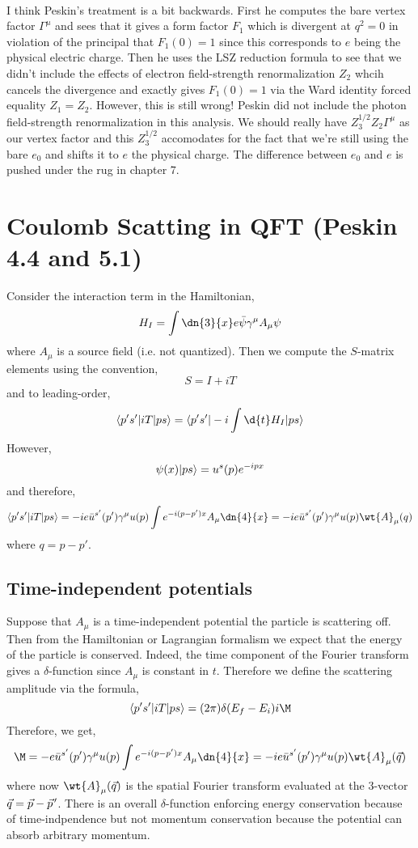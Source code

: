 \documentclass[12pt]{article}
\DeclarePairedDelimiter\bra{\langle}{\rvert}
\DeclarePairedDelimiter\ket{\lvert}{\rangle}
\newcommand{\pvec}[1]{\vec{#1}\mkern2mu\vphantom{#1}}
\begin{document}
\bigskip\\
I think Peskin's treatment is a bit backwards. First he computes the bare vertex factor $\Gamma^\mu$ and sees that it gives a form factor $F_1$ which is divergent at $q^2 = 0$ in violation of the principal that $F_1(0) = 1$ since this corresponds to $e$ being the physical electric charge. Then he uses the LSZ reduction formula to see that we didn't include the effects of electron field-strength renormalization $Z_2$ whcih cancels the divergence and exactly gives $F_1(0) = 1$ via the Ward identity forced equality $Z_1 = Z_2$. However, this is still wrong! Peskin did not include the photon field-strength renormalization in this analysis. We should really have $Z_3^{1/2} Z_2 \Gamma^\mu$ as our vertex factor and this $Z_3^{1/2}$ accomodates for the fact that we're still using the bare $e_0$ and shifts it to $e$ the physical charge. The difference between $e_0$ and $e$ is pushed under the rug in chapter 7.

\section{Coulomb Scatting in QFT (Peskin 4.4 and 5.1)}

Consider the interaction term in the Hamiltonian,
\[ H_I = \int \dn{3}{x} e \bar{\psi} \gamma^\mu A_\mu \psi \]
where $A_\mu$ is a source field (i.e. not quantized). Then we compute the $S$-matrix elements using the convention,
\[ S = I + i T \]
and to leading-order,
\[ \bra{p' s'} i T \ket{p s} = \bra{p' s'} - i \int \d{t} H_I \ket{ps} \]
However,
\[ \psi(x) \ket{ps} = u^s(p) e^{-i p x} \]
and therefore,
\[  \bra{p' s'} i T \ket{p s} = - i e \bar{u}^{s'}(p') \gamma^\mu u(p) \int e^{-i(p - p') x} A_\mu \dn{4}{x} = - i e \bar{u}^{s'}(p') \gamma^\mu u(p) \wt{A}_\mu(q) \]
where $q = p - p'$. 

\subsection{Time-independent potentials}

Suppose that $A_\mu$ is a time-independent potential the particle is scattering off. Then from the Hamiltonian or Lagrangian formalism we expect that the energy of the particle is conserved. Indeed, the time component of the Fourier transform gives a $\delta$-function since $A_\mu$ is constant in $t$. Therefore we define the scattering amplitude via the formula,
\[ \bra{p' s'} i T \ket{p s} = (2 \pi) \delta(E_f - E_i) i \M \]
Therefore, we get,
\[ \M = - e \bar{u}^{s'}(p') \gamma^\mu u(p) \int e^{-i(p - p') x} A_\mu \dn{4}{x} = - i e \bar{u}^{s'}(p') \gamma^\mu u(p) \wt{A}_\mu(\vec{q}) \]
where now $\wt{A}_\mu(\vec{q})$ is the spatial Fourier transform evaluated at the 3-vector $\vec{q} = \vec{p} - \pvec{p}'$. There is an overall $\delta$-function enforcing energy conservation because of time-indpendence but not momentum conservation because the potential can absorb arbitrary momentum. 
\end{document}
